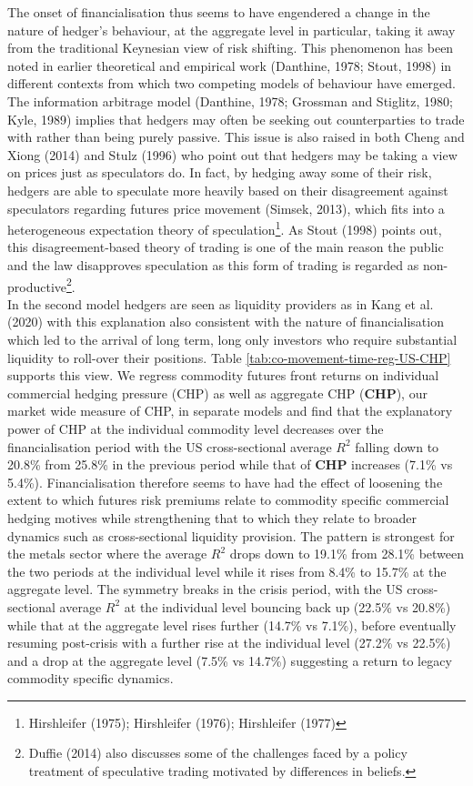 \documentclass[]{elsarticle} %
\begin{document}
\medskip\setlength{\parindent}{0pt}

The onset of financialisation thus seems to have engendered a change in the nature of hedger's behaviour, at the aggregate level in particular, taking it away from the traditional Keynesian view of risk shifting. This phenomenon has been noted in earlier theoretical and empirical work (Danthine, 1978; Stout, 1998) in different contexts from which two competing models of behaviour have emerged.\\
The information arbitrage model (Danthine, 1978; Grossman and Stiglitz, 1980; Kyle, 1989) implies that hedgers may often be seeking out counterparties to trade with rather than being purely passive. This issue is also raised in both Cheng and Xiong (2014) and Stulz (1996) who point out that hedgers may be taking a view on prices just as speculators do. In fact, by hedging away some of their risk, hedgers are able to speculate more heavily based on their disagreement against speculators regarding futures price movement (Simsek, 2013), which fits into a heterogeneous expectation theory of speculation\footnote{Hirshleifer (1975); Hirshleifer (1976); Hirshleifer (1977)}. As Stout (1998) points out, this disagreement-based theory of trading is one of the main reason the public and the law disapproves speculation as this form of trading is regarded as non-productive\footnote{Duffie (2014) also discusses some of the challenges faced by a policy treatment of speculative trading motivated by differences in beliefs.}.\\
In the second model hedgers are seen as liquidity providers as in Kang et al. (2020) with this explanation also consistent with the nature of financialisation which led to the arrival of long term, long only investors who require substantial liquidity to roll-over their positions. Table \ref{tab:co-movement-time-reg-US-CHP} supports this view. We regress commodity futures front returns on individual commercial hedging pressure (CHP) as well as aggregate CHP (\textbf{CHP}), our market wide measure of CHP, in separate models and find that the explanatory power of CHP at the individual commodity level decreases over the financialisation period with the US cross-sectional average \(R^{2}\) falling down to 20.8\% from 25.8\% in the previous period while that of \textbf{CHP} increases (7.1\% vs 5.4\%). Financialisation therefore seems to have had the effect of loosening the extent to which futures risk premiums relate to commodity specific commercial hedging motives while strengthening that to which they relate to broader dynamics such as cross-sectional liquidity provision. The pattern is strongest for the metals sector where the average \(R^{2}\) drops down to 19.1\% from 28.1\% between the two periods at the individual level while it rises from 8.4\% to 15.7\% at the aggregate level. The symmetry breaks in the crisis period, with the US cross-sectional average \(R^{2}\) at the individual level bouncing back up (22.5\% vs 20.8\%) while that at the aggregate level rises further (14.7\% vs 7.1\%), before eventually resuming post-crisis with a further rise at the individual level (27.2\% vs 22.5\%) and a drop at the aggregate level (7.5\% vs 14.7\%) suggesting a return to legacy commodity specific dynamics.
\end{document}
